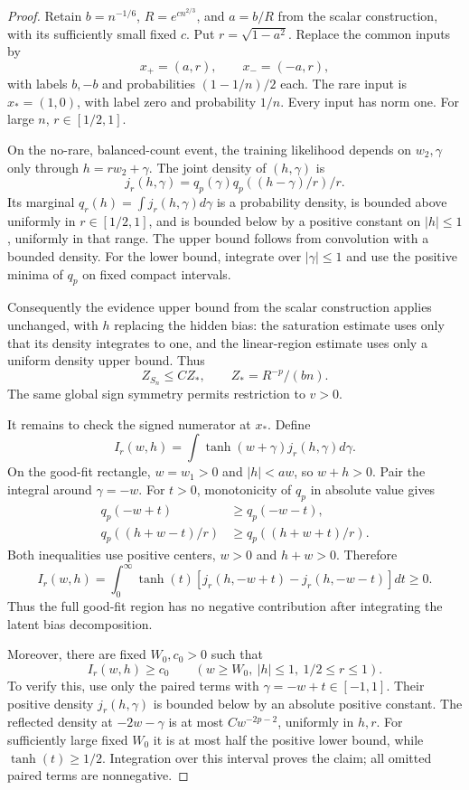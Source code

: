 \begin{proof}
Retain $b=n^{-1/6}$, $R=e^{c n^{2/3}}$, and $a=b/R$ from the scalar construction, with its sufficiently small fixed $c$. Put $r=\sqrt{1-a^2}$. Replace the common inputs by
\[
 x_+=(a,r),\qquad x_-=(-a,r),
\]
with labels $b,-b$ and probabilities $(1-1/n)/2$ each. The rare input is $x_*=(1,0)$, with label zero and probability $1/n$. Every input has norm one. For large $n$, $r\in[1/2,1]$.

On the no-rare, balanced-count event, the training likelihood depends on $w_2,\gamma$ only through $h=rw_2+\gamma$. The joint density of $(h,\gamma)$ is
\[
 j_r(h,\gamma)=q_p(\gamma)q_p((h-\gamma)/r)/r.
\]
Its marginal $q_r(h)=\int j_r(h,\gamma)d\gamma$ is a probability density, is bounded above uniformly in $r\in[1/2,1]$, and is bounded below by a positive constant on $|h|\le1$, uniformly in that range. The upper bound follows from convolution with a bounded density. For the lower bound, integrate over $|\gamma|\le1$ and use the positive minima of $q_p$ on fixed compact intervals.

Consequently the evidence upper bound from the scalar construction applies unchanged, with $h$ replacing the hidden bias: the saturation estimate uses only that its density integrates to one, and the linear-region estimate uses only a uniform density upper bound. Thus
\[
 Z_{S_n}\le C Z_*,\qquad Z_*=R^{-p}/(bn).
\]
The same global sign symmetry permits restriction to $v>0$.

It remains to check the signed numerator at $x_*$. Define
\[
 I_r(w,h)=\int\tanh(w+\gamma)j_r(h,\gamma)d\gamma.
\]
On the good-fit rectangle, $w=w_1>0$ and $|h|<aw$, so $w+h>0$. Pair the integral around $\gamma=-w$. For $t>0$, monotonicity of $q_p$ in absolute value gives
\begin{align*}
 q_p(-w+t)&\ge q_p(-w-t),\\
 q_p((h+w-t)/r)&\ge q_p((h+w+t)/r).
\end{align*}
Both inequalities use positive centers, $w>0$ and $h+w>0$. Therefore
\[
 I_r(w,h)=\int_0^\infty\tanh(t)
       [j_r(h,-w+t)-j_r(h,-w-t)]dt\ge0.
\]
Thus the full good-fit region has no negative contribution after integrating the latent bias decomposition.

Moreover, there are fixed $W_0,c_0>0$ such that
\[
 I_r(w,h)\ge c_0\qquad(w\ge W_0,\ |h|\le1,\ 1/2\le r\le1).
\]
To verify this, use only the paired terms with $\gamma=-w+t\in[-1,1]$. Their positive density $j_r(h,\gamma)$ is bounded below by an absolute positive constant. The reflected density at $-2w-\gamma$ is at most $Cw^{-2p-2}$, uniformly in $h,r$. For sufficiently large fixed $W_0$ it is at most half the positive lower bound, while $\tanh(t)\ge1/2$. Integration over this interval proves the claim; all omitted paired terms are nonnegative.


\end{proof}
